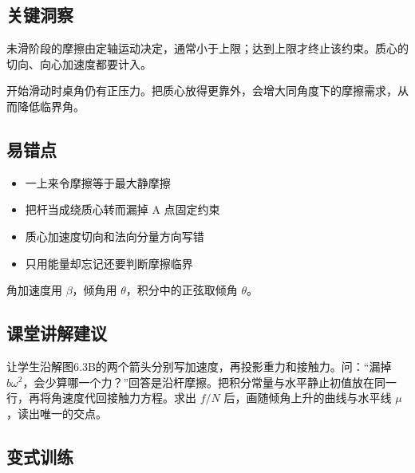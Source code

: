 \documentclass[UTF8,fontset=fandol,a4paper,11pt]{ctexart}
\providecommand{\tightlist}{\setlength{\itemsep}{0pt}\setlength{\parskip}{0pt}}
\begin{document}


\subsection*{关键洞察}

未滑阶段的摩擦由定轴运动决定，通常小于上限；达到上限才终止该约束。质心的切向、向心加速度都要计入。

开始滑动时桌角仍有正压力。把质心放得更靠外，会增大同角度下的摩擦需求，从而降低临界角。



\subsection*{易错点}

\begin{itemize}
\tightlist
\item
  一上来令摩擦等于最大静摩擦
\item
  把杆当成绕质心转而漏掉 A 点固定约束
\item
  质心加速度切向和法向分量方向写错
\item
  只用能量却忘记还要判断摩擦临界
\end{itemize}

角加速度用 $\beta$，倾角用 $\theta$，积分中的正弦取倾角 $\theta$。



\subsection*{课堂讲解建议}

让学生沿解图6.3B的两个箭头分别写加速度，再投影重力和接触力。问：“漏掉 $b\omega^2$，会少算哪一个力？”回答是沿杆摩擦。把积分常量与水平静止初值放在同一行，再将角速度代回接触力方程。求出 $f/N$ 后，画随倾角上升的曲线与水平线 $\mu$，读出唯一的交点。




\subsection*{变式训练}
\end{document}
